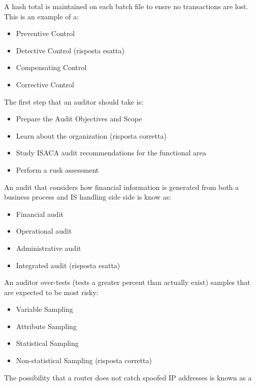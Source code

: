 

A hash total is maintained on each batch file to ensre no transactions are lost.
This is an example of a:
\begin{itemize}
\item Preventive Control
\item Detective Control (risposta esatta)
\item Compensating Control
\item Corrective Control
\end{itemize}




The first step that an auditor should take is:
\begin{itemize}
\item Prepare the Audit Objectives and Scope
\item Learn about the organization (risposta corretta)
\item Study ISACA audit recommendations for the functional area
\item Perform a rusk assessment
\end{itemize}


An audit that considers how financial information is generated from both a
business process and IS handling side side is know as:
\begin{itemize}
\item Financial audit
\item Operational audit
\item Administrative audit
\item Integrated audit (risposta esatta)
\end{itemize}


An auditor over-tests (tests a greater percent than actually exist) samples that
are expected to be most risky:
\begin{itemize}
\item Variable Sampling
\item Attribute Sampling
\item Statistical Sampling
\item Non-statistical Sampling (risposta corretta)
\end{itemize}


The possibility that a router does not catch spoofed IP addresses is known as a

